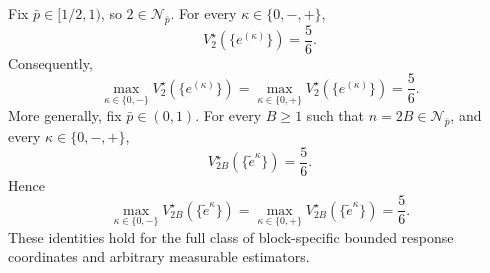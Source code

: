 Fix \(\bar p\in[1/2,1)\), so \(2\in\mathcal N_{\bar p}\).  For every \(\kappa\in\{0,-,+\}\),
\[
 V_2^\star(\{e^{(\kappa)}\})=\frac56.
\]
Consequently,
\[
 \max_{\kappa\in\{0,-\}}V_2^\star(\{e^{(\kappa)}\})
 =\max_{\kappa\in\{0,+\}}V_2^\star(\{e^{(\kappa)}\})
 =\frac56.
\]
More generally, fix \(\bar p\in(0,1)\).  For every \(B\ge1\) such that \(n=2B\in\mathcal N_{\bar p}\), and every \(\kappa\in\{0,-,+\}\),
\[
 V_{2B}^\star(\{\widetilde e^\kappa\})=\frac56.
\]
Hence
\[
 \max_{\kappa\in\{0,-\}}V_{2B}^\star(\{\widetilde e^\kappa\})
 =\max_{\kappa\in\{0,+\}}V_{2B}^\star(\{\widetilde e^\kappa\})
 =\frac56.
\]
These identities hold for the full class of block-specific bounded response coordinates and arbitrary measurable estimators.